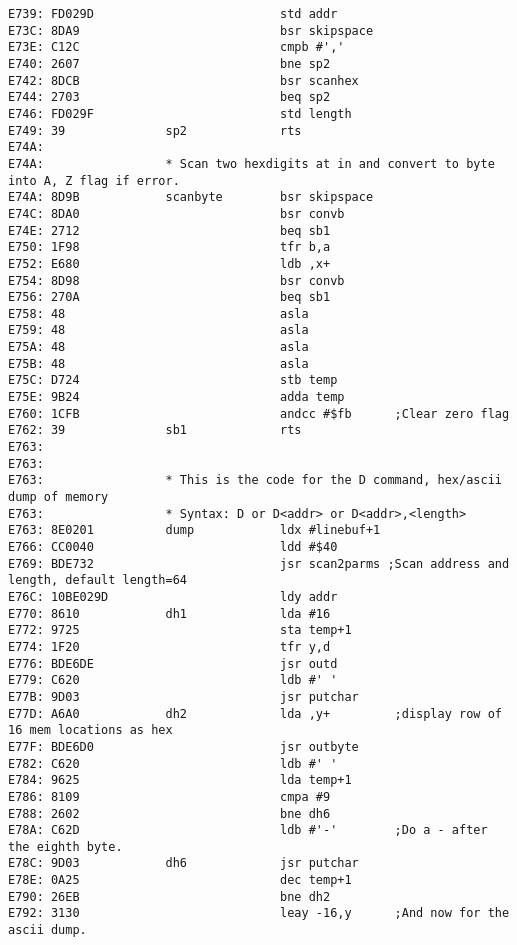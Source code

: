{\begin{verbatim}
E739: FD029D                          std addr
E73C: 8DA9                            bsr skipspace
E73E: C12C                            cmpb #','
E740: 2607                            bne sp2
E742: 8DCB                            bsr scanhex
E744: 2703                            beq sp2
E746: FD029F                          std length                              
E749: 39              sp2             rts
E74A:                 
E74A:                 * Scan two hexdigits at in and convert to byte into A, Z flag if error.
E74A: 8D9B            scanbyte        bsr skipspace
E74C: 8DA0                            bsr convb
E74E: 2712                            beq sb1
E750: 1F98                            tfr b,a
E752: E680                            ldb ,x+
E754: 8D98                            bsr convb
E756: 270A                            beq sb1
E758: 48                              asla
E759: 48                              asla
E75A: 48                              asla
E75B: 48                              asla
E75C: D724                            stb temp
E75E: 9B24                            adda temp
E760: 1CFB                            andcc #$fb      ;Clear zero flag
E762: 39              sb1             rts
E763:                 
E763:                 
E763:                 * This is the code for the D command, hex/ascii dump of memory
E763:                 * Syntax: D or D<addr> or D<addr>,<length>      
E763: 8E0201          dump            ldx #linebuf+1
E766: CC0040                          ldd #$40        
E769: BDE732                          jsr scan2parms ;Scan address and length, default length=64
E76C: 10BE029D                        ldy addr
E770: 8610            dh1             lda #16
E772: 9725                            sta temp+1      
E774: 1F20                            tfr y,d
E776: BDE6DE                          jsr outd
E779: C620                            ldb #' '
E77B: 9D03                            jsr putchar
E77D: A6A0            dh2             lda ,y+         ;display row of 16 mem locations as hex
E77F: BDE6D0                          jsr outbyte
E782: C620                            ldb #' '
E784: 9625                            lda temp+1
E786: 8109                            cmpa #9
E788: 2602                            bne dh6
E78A: C62D                            ldb #'-'        ;Do a - after the eighth byte.
E78C: 9D03            dh6             jsr putchar
E78E: 0A25                            dec temp+1
E790: 26EB                            bne dh2
E792: 3130                            leay -16,y      ;And now for the ascii dump.

\end{verbatim}}
